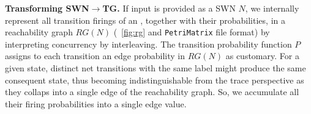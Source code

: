 \medskip

\textbf{Transforming SWN$\to$TG.} If input is provided as a SWN $N$,  we internally represent all transition firings of an \uswn, together with their probabilities, in a reachability graph $RG(N)$ (\figurename~\ref{fig:rg} and \texttt{PetriMatrix} file format) by interpreting concurrency by interleaving. The transition probability function $P$ assigns to each transition an edge probability in $RG(N)$ as customary.  %
For a given state, distinct net transitions with the same label might produce the same consequent state, thus becoming indistinguishable from the trace perspective as they collaps into a single edge of the reachability graph. So, we accumulate all their firing probabilities into a single edge value.
